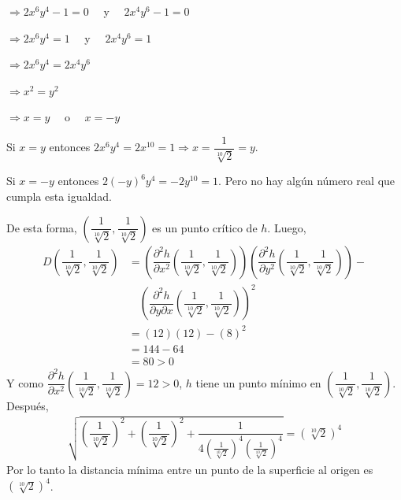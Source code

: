 \documentclass[fleqn, 12pt]{article}
\newcommand{\derivadaparcialn}[3]{\dfrac{\partial^{#3} {#1}}{\partial {#2}^{#3}}}
\newcommand{\derivadaparcialnd}[3]{\dfrac{\partial^{2} {#1}}{\partial {#3} \partial {#2}}}
\begin{document}
\begin{enumerate}
        $ \Longrightarrow 2x^6 y^4 - 1 = 0 \quad $ y $ \quad 2x^4 y^6 - 1 = 0 $

        $ \Longrightarrow 2x^6 y^4 = 1 \quad $ y $ \quad 2x^4 y^6 = 1 $

        $ \Longrightarrow 2x^6 y^4 = 2x^4 y^6 $

        $ \Longrightarrow x^2 = y^2 $

        $ \Longrightarrow x = y \quad $ o $ \quad x = -y $

        Si $ x = y $ entonces $ 2x^6 y^4 = 2x^{10} = 1 \Longrightarrow x = \dfrac{1}{\sqrt[10]{2}} = y $.

        Si $ x = -y $ entonces $ 2(-y)^6 y^4 = -2y^{10} = 1 $. Pero no hay algún número real que cumpla esta igualdad.

        De esta forma, $ \left( \dfrac{1}{\sqrt[10]{2}}, \dfrac{1}{\sqrt[10]{2}} \right) $ es un punto crítico de $ h $. Luego,
        \begin{align*}
            D \left( \dfrac{1}{\sqrt[10]{2}}, \dfrac{1}{\sqrt[10]{2}} \right) &= \left( \derivadaparcialn{h}{x}{2} \left( \dfrac{1}{\sqrt[10]{2}}, \dfrac{1}{\sqrt[10]{2}} \right) \right) \left( \derivadaparcialn{h}{y}{2} \left( \dfrac{1}{\sqrt[10]{2}}, \dfrac{1}{\sqrt[10]{2}} \right) \right) - \\
            & \quad \left( \derivadaparcialnd{h}{x}{y} \left( \dfrac{1}{\sqrt[10]{2}}, \dfrac{1}{\sqrt[10]{2}} \right) \right)^2 \\
            &= (12)(12) - (8)^2 \\
            &= 144 - 64 \\
            &= 80 > 0
        \end{align*}
        Y como $ \derivadaparcialn{h}{x}{2} \left( \dfrac{1}{\sqrt[10]{2}}, \dfrac{1}{\sqrt[10]{2}} \right) = 12 > 0 $, $ h $ tiene un punto mínimo en $ \left( \dfrac{1}{\sqrt[10]{2}}, \dfrac{1}{\sqrt[10]{2}} \right) $. Después,
        \begin{align*}
            \sqrt{\left( \dfrac{1}{\sqrt[10]{2}} \right)^2 + \left( \dfrac{1}{\sqrt[10]{2}} \right)^2 + \dfrac{1}{4 \left( \frac{1}{\sqrt[10]{2}} \right)^4 \left( \frac{1}{\sqrt[10]{2}} \right)^4}} = \left( \sqrt[10]{2} \right)^4
        \end{align*}
        Por lo tanto la distancia mínima entre un punto de la superficie al origen es $ \left( \sqrt[10]{2} \right)^4 $.
    \end{enumerate}
\end{document}
